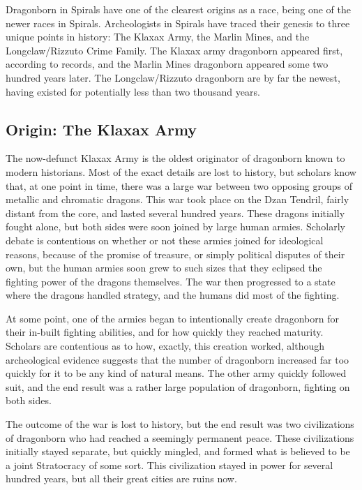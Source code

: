 Dragonborn in Spirals have one of the clearest origins as a race, being one of the newer races in Spirals.
Archeologists in Spirals have traced their genesis to three unique points in history: The Klaxax Army, the Marlin Mines, and the Longclaw/Rizzuto Crime Family.
The Klaxax army dragonborn appeared first, according to records, and the Marlin Mines dragonborn appeared some two hundred years later.
The Longclaw/Rizzuto dragonborn are by far the newest, having existed for potentially less than two thousand years.

\subsection{Origin: The Klaxax Army}
The now-defunct Klaxax Army is the oldest originator of dragonborn known to modern historians.
Most of the exact details are lost to history, but scholars know that, at one point in time, there was a large war between two opposing groups of metallic and chromatic dragons.
This war took place on the Dzan Tendril, fairly distant from the core, and lasted several hundred years.
These dragons initially fought alone, but both sides were soon joined by large human armies. 
Scholarly debate is contentious on whether or not these armies joined for ideological reasons, because of the promise of treasure, or simply political disputes of their own, but the human armies soon grew to such sizes that they eclipsed the fighting power of the dragons themselves.
The war then progressed to a state where the dragons handled strategy, and the humans did most of the fighting.

At some point, one of the armies began to intentionally create dragonborn for their in-built fighting abilities, and for how quickly they reached maturity.
Scholars are contentious as to how, exactly, this creation worked, although archeological evidence suggests that the number of dragonborn increased far too quickly for it to be any kind of natural means.
The other army quickly followed suit, and the end result was a rather large population of dragonborn, fighting on both sides.

The outcome of the war is lost to history, but the end result was two civilizations of dragonborn who had reached a seemingly permanent peace.
These civilizations initially stayed separate, but quickly mingled, and formed what is believed to be a joint Stratocracy of some sort.
This civilization stayed in power for several hundred years, but all their great cities are ruins now.

